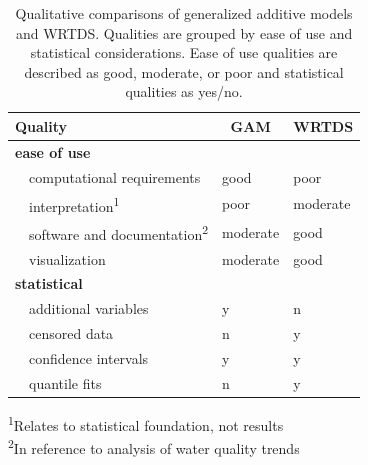 \documentclass[letterpaper,12pt,oneside]{article}\usepackage[]{graphicx}\usepackage[]{color}
\begin{document}
\begin{table}[!tbp]
\caption{Qualitative comparisons of generalized additive models and WRTDS.  Qualities are grouped by ease of use and statistical considerations.  Ease of use qualities are described as good, moderate, or poor and statistical qualities as yes/no.\label{tab:qualcomp}} 
\begin{center}
\begin{tabular}{lll}
\hline\hline
\multicolumn{1}{l}{Quality}&\multicolumn{1}{c}{\ac{GAM}}&\multicolumn{1}{c}{\ac{WRTDS}}\tabularnewline
\hline
{\bfseries ease of use}&&\tabularnewline
~~computational requirements&good&poor\tabularnewline
~~interpretation\textsuperscript{1}&poor&moderate\tabularnewline
~~software and documentation\textsuperscript{2}&moderate&good\tabularnewline
~~visualization&moderate&good\tabularnewline
\hline
{\bfseries statistical}&&\tabularnewline
~~additional variables&y&n\tabularnewline
~~censored data&n&y\tabularnewline
~~confidence intervals&y&y\tabularnewline
~~quantile fits&n&y\tabularnewline
\hline
\end{tabular}\end{center}

\textsuperscript{1}\footnotesize{Relates to statistical foundation, not results}\\\textsuperscript{2}\footnotesize{In reference to analysis of water quality trends}\end{table}



\end{document}

